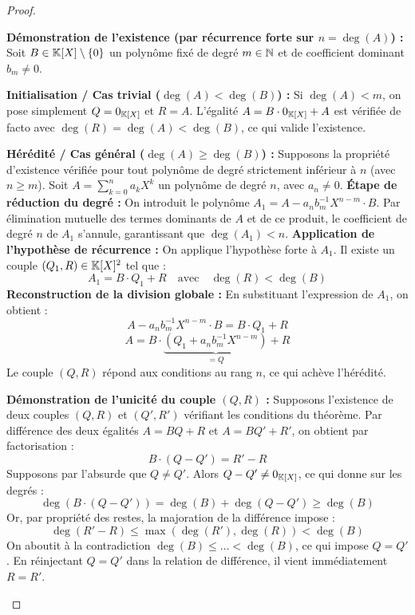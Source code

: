 \documentclass[12pt, a4paper]{report}
\begin{document}
\begin{proof}
    \begin{outline}
        \1 \textbf{Démonstration de l'existence (par récurrence forte sur $n = \deg(A)$) :}
            \2 Soit $B \in \mathbb{K}[X]\setminus\{0\}$ un polynôme fixé de degré $m \in \mathbb{N}$ et de coefficient dominant $b_m \neq 0$.
            
            \2 \textbf{Initialisation / Cas trivial ($\deg(A) < \deg(B)$) :}
                \3 Si $\deg(A) < m$, on pose simplement $Q = 0_{\mathbb{K}[X]}$ et $R = A$.
                \3 L'égalité $A = B \cdot 0_{\mathbb{K}[X]} + A$ est vérifiée de facto avec $\deg(R) = \deg(A) < \deg(B)$, ce qui valide l'existence.

            \2 \textbf{Hérédité / Cas général ($\deg(A) \ge \deg(B)$) :}
                \3 Supposons la propriété d'existence vérifiée pour tout polynôme de degré strictement inférieur à $n$ (avec $n \ge m$). 
                \3 Soit $A = \sum_{k=0}^{n}a_k X^k$ un polynôme de degré $n$, avec $a_n \ne 0$.
                \3 \textbf{Étape de réduction du degré :} On introduit le polynôme $A_1 = A - a_n b_m^{-1} X^{n-m} \cdot B$.
                \3 Par élimination mutuelle des termes dominants de $A$ et de ce produit, le coefficient de degré $n$ de $A_1$ s'annule, garantissant que $\deg(A_1) < n$.
                \3 \textbf{Application de l'hypothèse de récurrence :} On applique l'hypothèse forte à $A_1$. Il existe un couple $(Q_1, R) \in \mathbb{K}[X]^2$ tel que :
                   \[ A_1 = B \cdot Q_1 + R \quad \text{avec} \quad \deg(R) < \deg(B) \]
                \3 \textbf{Reconstruction de la division globale :} En substituant l'expression de $A_1$, on obtient :
                   \[ A - a_n b_m^{-1} X^{n-m} \cdot B = B \cdot Q_1 + R \]
                   \[ A = B \cdot \underbrace{\left(Q_1 + a_n b_m^{-1} X^{n-m}\right)}_{=Q} + R \]
                \3 Le couple $(Q,R)$ répond aux conditions au rang $n$, ce qui achève l'hérédité.

        \1 \textbf{Démonstration de l'unicité du couple $(Q,R)$ :}
            \2 Supposons l'existence de deux couples $(Q,R)$ et $(Q',R')$ vérifiant les conditions du théorème.
            \2 Par différence des deux égalités $A = BQ + R$ et $A = BQ' + R'$, on obtient par factorisation :
               \[ B \cdot (Q - Q') = R' - R \]
            \2 Supposons par l'absurde que $Q \neq Q'$. Alors $Q - Q' \neq 0_{\mathbb{K}[X]}$, ce qui donne sur les degrés :
               \[ \deg\left(B \cdot (Q - Q')\right) = \deg(B) + \deg(Q - Q') \ge \deg(B) \]
            \2 Or, par propriété des restes, la majoration de la différence impose :
               \[ \deg(R' - R) \le \max(\deg(R'), \deg(R)) < \deg(B) \]
            \2 On aboutit à la contradiction $\deg(B) \le \dots < \deg(B)$, ce qui impose $Q = Q'$.
            \2 En réinjectant $Q = Q'$ dans la relation de différence, il vient immédiatement $R = R'$.
    \end{outline}
\end{proof}
\end{document}
